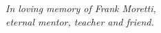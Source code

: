 %

\vspace*{\fill}
\begin{center}
      \emph{In loving memory of Frank Moretti,\\
      		eternal mentor, teacher and friend.}
\end{center}
\vspace*{\fill}

